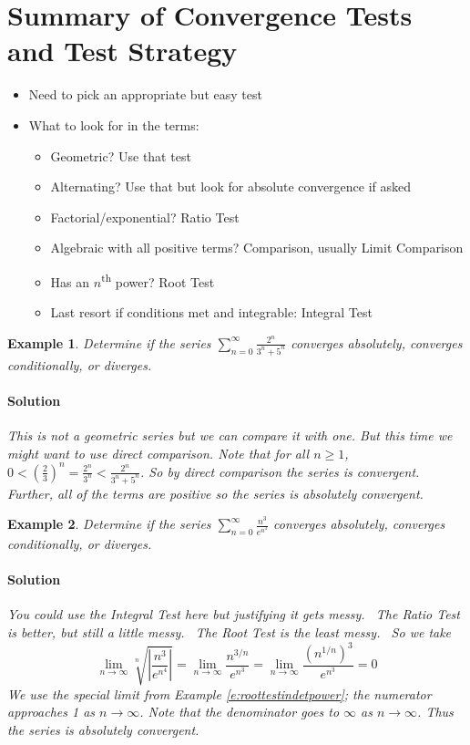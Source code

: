 \documentclass[letterpaper, 11pt, openany]{book}
\theoremstyle{mytheoremstyle}
\theoremstyle{myexamplestyle}
\newtheorem{example}{Example}[section]
\newenvironment{solution}{\paragraph{\sffamily \smaller \fontseries{b}\selectfont Solution}}{\hfill\faSquare}
\begin{document}
\section{Summary of Convergence Tests and Test Strategy}
\setcounter{figure}{0}
\begin{itemize}
    \item Need to pick an appropriate but easy test
    \item What to look for in the terms:
    \begin{itemize}
        \item Geometric? Use that test
        \item Alternating? Use that but look for absolute convergence if asked
        \item Factorial/exponential? Ratio Test
        \item Algebraic with all positive terms? Comparison, usually Limit Comparison
        \item Has an $n$\textsuperscript{th} power? Root Test
        \item Last resort if conditions met and integrable: Integral Test
    \end{itemize}
\end{itemize}

\begin{example}\label{e:seriestestsgeolike}
    Determine if the series $\displaystyle \sum_{n=0}^{\infty} \frac{2^{n}}{3^{n} + 5^{n}}$ converges absolutely, converges conditionally, or diverges.
    \begin{solution}
        This is not a geometric series but we can compare it with one. But this time we might want to use direct comparison. Note that for all $n \geq 1$, $\displaystyle 0 < \left( \frac{2}{3} \right)^{n} = \frac{2^{n}}{3^{n}} < \frac{2^{n}}{3^{n} + 5^{n}}$. So by direct comparison the series is convergent. Further, all of the terms are positive so the series is absolutely convergent.
    \end{solution}
\end{example}

\begin{example}\label{e:seriestestsroot}
    Determine if the series $\displaystyle \sum_{n=0}^{\infty} \frac{n^{3}}{e^{n^{4}}}$ converges absolutely, converges conditionally, or diverges.
    \begin{solution}
        You could use the Integral Test here but justifying it gets messy. \faFrown \ The Ratio Test is better, but still a little messy. \faMeh \ The Root Test is the least messy. \faSmile \ So we take
        \[\lim_{n \to \infty} \sqrt[n]{\left| \frac{n^{3}}{e^{n^{4}}} \right|} = \lim_{n \to \infty} \frac{n^{3/n}}{e^{n^{3}}} = \lim_{n \to \infty} \frac{\left(n^{1/n}\right)^{3}}{e^{n^{3}}} = 0\]
        We use the special limit from Example \ref{e:roottestindetpower}; the numerator approaches 1 as $n \to \infty$. Note that the denominator goes to $\infty$ as $n \to \infty$. Thus the series is absolutely convergent.
    \end{solution}    
\end{example}
\end{document}
